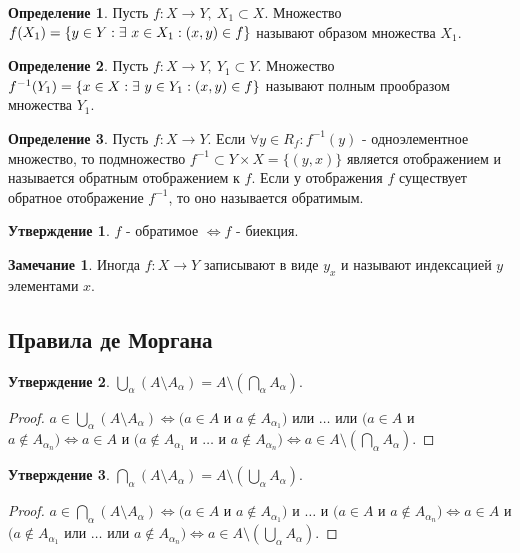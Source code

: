 \documentclass[a4paper, 12pt]{article}
\newcommand{\lra}{\Leftrightarrow}
\theoremstyle{definition}
\newtheorem*{definition}{Определение}
\newtheorem*{comm}{Замечание}
\newtheorem*{statement}{Утверждение}
\begin{document}
        \begin{definition}
            Пусть $f:X\to Y,\ X_1\subset X$. Множество $f(X_1)=\\ \{y\in Y: \exists\ x\in X_1 : (x,y)\in f\}$ называют образом множества $X_1$.
        \end{definition}
        \begin{definition}
            Пусть $f:X\to Y,\ Y_1\subset Y$. Множество $f^{-1}(Y_1)=\\ \{x\in X: \exists\ y\in Y_1 : (x,y)\in f\}$ называют полным прообразом множества $Y_1$.
        \end{definition}
        \begin{definition}
            Пусть $f:X\to Y$. Если $\forall y\in R_f: f^{-1}(y)$ - одноэлементное множество, то подмножество $f^{-1}\subset Y\times X=\{(y,x)\}$ является отображением и называется обратным отображением к $f$. Если у отображения $f$ существует обратное отображение $f^{-1}$, то оно называется обратимым.
        \end{definition}
        \begin{statement}
            $f$ - обратимое $\lra f$ - биекция.
        \end{statement}
        \begin{comm}
        Иногда $f: X\to Y$ записывают в виде $y_x$ и называют индексацией $y$ элементами $x$.
        \end{comm}
    \subsection{Правила де Моргана}
        \begin{statement}
            $\bigcup\limits_{\alpha}(A\setminus A_{\alpha}) = A\setminus (\bigcap\limits_{\alpha}A_{\alpha})$.
        \end{statement}
        \begin{proof}
            $a\in \bigcup\limits_{\alpha}(A\setminus A_{\alpha})\lra (a\in A$ и $a\notin A_{\alpha_1})$ или $\dots$ или $(a\in A$ и $a\notin A_{\alpha_n})\lra a\in A$ и $(a\notin A_{\alpha_1}$ и $\dots$ и $a\notin A_{\alpha_n})\lra a\in A\setminus (\bigcap\limits_{\alpha}A_{\alpha})$.
        \end{proof}
        \begin{statement}
            $\bigcap\limits_{\alpha}(A\setminus A_{\alpha}) = A\setminus (\bigcup\limits_{\alpha}A_{\alpha})$.
        \end{statement}
        \begin{proof}
            $a\in \bigcap\limits_{\alpha}(A\setminus A_{\alpha})\lra (a\in A$ и $a\notin A_{\alpha_1})$ и $\dots$ и $(a\in A$ и $a\notin A_{\alpha_n})\lra a\in A$ и $(a\notin A_{\alpha_1}$ или $\dots$ или $a\notin A_{\alpha_n})\lra a\in A\setminus (\bigcup\limits_{\alpha}A_{\alpha})$.
        \end{proof}
\end{document}
